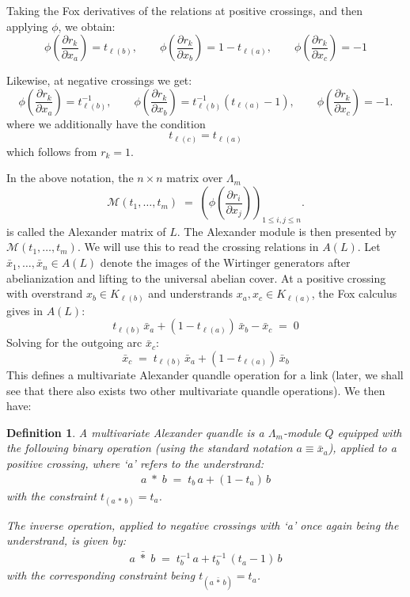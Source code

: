 \documentclass[a4paper,12pt]{article}
\newtheorem{definition}{Definition}[section]
\newcommand{\Lm}{\Lambda_m}
\newcommand{\AL}{A(L)}
\begin{document}
Taking the Fox derivatives of the relations at positive crossings, and then  applying $\phi$,  we obtain:
\[
  \phi\!\left(\frac{\partial r_k}{\partial x_a}\right) = t_{\ell(b)},
  \qquad
  \phi\!\left(\frac{\partial r_k}{\partial x_b}\right)
    = 1 - t_{\ell(a)},
  \qquad
  \phi\!\left(\frac{\partial r_k}{\partial x_c}\right)
    = -1
\]

Likewise, at negative crossings we get:
\[
  \phi\!\left(\frac{\partial r_k}{\partial x_a}\right) = t_{\ell(b)}^{-1},
  \qquad
  \phi\!\left(\frac{\partial r_k}{\partial x_b}\right)
    = t_{\ell(b)}^{-1} \left(t_{\ell(a)} - 1\right),
  \qquad
  \phi\!\left(\frac{\partial r_k}{\partial x_c}\right)
    = -1.
\]
where we additionally have the condition
\[  t_{\ell(c)} = t_{\ell(a)}  \]
which follows from $r_k = 1$. 

In the above notation, the $n \times n$ matrix over $\Lm$ 
\[
  \mathcal{M}(t_1, \ldots, t_m)
  \;=\;
  \left(\phi\!\left(\frac{\partial r_i}{\partial x_j}
        \right)\right)_{1 \leq i,j \leq n}.
\]
is called the Alexander matrix of $L$.  The Alexander module is then presented by $\mathcal{M}(t_1,\ldots,t_m)$.  We will use this to read the crossing relations in $A(L)$.  Let $\bar{x}_1, \ldots, \bar{x}_n \in \AL$ denote the images of the  Wirtinger generators after abelianization and lifting to the
universal abelian cover.  
At a positive crossing with overstrand $x_b \in K_{\ell(b)}$ and
understrands $x_a, x_c \in K_{\ell(a)}$, the Fox calculus gives in
$\AL$:
\[   t_{\ell(b)}\,\bar{x}_a  +  (1 - t_{\ell(a)})\,\bar{x}_b  - \bar{x}_c  \;=\; 0 
\]
Solving for the outgoing arc $\bar{x}_c$:
\[
  \bar{x}_c 
  \;=\;
  t_{\ell(b)}\,\bar{x}_a + (1 - t_{\ell(a)})\,\bar{x}_b  \]
This defines a multivariate Alexander quandle operation for a link (later, we shall see that there also exists two other multivariate quandle operations). We then have:
\begin{definition} 
A \emph{multivariate Alexander quandle} is a $\Lm$-module $Q$
equipped with the following binary operation (using the standard notation $a \equiv \bar{x}_a$), applied to a positive crossing, where `a' refers to the understrand:   
\begin{eqnarray}
  a \;*\; b \;=\; t_b\,a + (1 - t_a)\,b  
\label{foxmqdef1}
\end{eqnarray}  
with the constraint  $t_{(a \,*\, b)} = t_a$.

The inverse operation, applied to negative crossings with `a' once again being the understrand, is given by: 
\begin{eqnarray}
   a \;\bar{*}\; b \;=\; t_b^{-1}\,a + t_b^{-1} \, (t_a - 1)\,b   
\label{foxmqdef2}
\end{eqnarray}  
with the corresponding constraint being  $t_{(a \,\bar{*}\, b)} = t_a$.
\end{definition}
\end{document}
